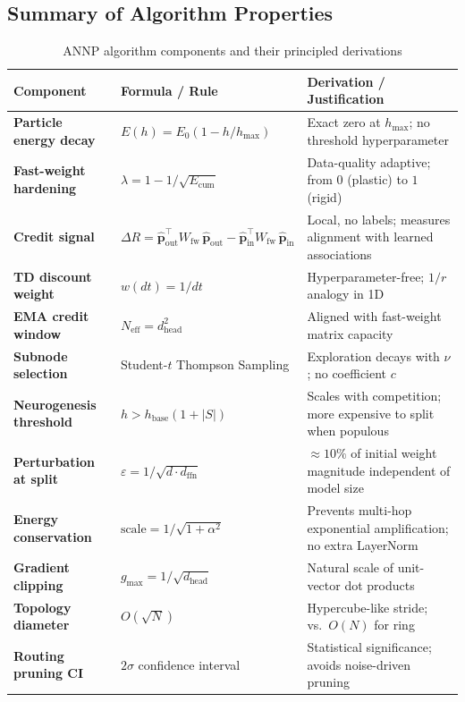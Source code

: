 \documentclass[11pt,a4paper]{article}
\theoremstyle{definition}
\newcommand{\vp}{\mathbf{p}}
\begin{document}
\subsection{Summary of Algorithm Properties}
\label{sec:summary}

\begin{table}[ht]
\centering
\caption{ANNP algorithm components and their principled derivations}
\label{tab:summary}
\renewcommand{\arraystretch}{1.35}
\begin{tabular}{>{\bfseries}p{4cm} p{5cm} p{5.5cm}}
\toprule
Component & Formula / Rule & Derivation / Justification \\
\midrule
Particle energy decay & $E(h) = E_0(1 - h/h_\text{max})$ &
  Exact zero at $h_\text{max}$; no threshold hyperparameter \\
Fast-weight hardening & $\lambda = 1 - 1/\sqrt{E_\text{cum}}$ &
  Data-quality adaptive; from $0$ (plastic) to $1$ (rigid) \\
Credit signal & $\Delta R = \hat{\vp}_\text{out}^\top W_\text{fw}\,\hat{\vp}_\text{out} - \hat{\vp}_\text{in}^\top W_\text{fw}\,\hat{\vp}_\text{in}$ &
  Local, no labels; measures alignment with learned associations \\
TD discount weight & $w(dt) = 1/dt$ &
  Hyperparameter-free; $1/r$ analogy in 1D \\
EMA credit window & $N_\text{eff} = d_\text{head}^2$ &
  Aligned with fast-weight matrix capacity \\
Subnode selection & Student-$t$ Thompson Sampling &
  Exploration decays with $\nu$; no coefficient $c$ \\
Neurogenesis threshold & $h > h_\text{base}(1 + |S|)$ &
  Scales with competition; more expensive to split when populous \\
Perturbation at split & $\varepsilon = 1/\sqrt{d \cdot d_\text{ffn}}$ &
  $\approx 10\%$ of initial weight magnitude independent of model size \\
Energy conservation & $\text{scale} = 1/\sqrt{1+\alpha^2}$ &
  Prevents multi-hop exponential amplification; no extra LayerNorm \\
Gradient clipping & $g_\text{max} = 1/\sqrt{d_\text{head}}$ &
  Natural scale of unit-vector dot products \\
Topology diameter & $O(\sqrt{N})$ &
  Hypercube-like stride; vs.\ $O(N)$ for ring \\
Routing pruning CI & $2\sigma$ confidence interval &
  Statistical significance; avoids noise-driven pruning \\
\bottomrule
\end{tabular}
\end{table}
\end{document}
